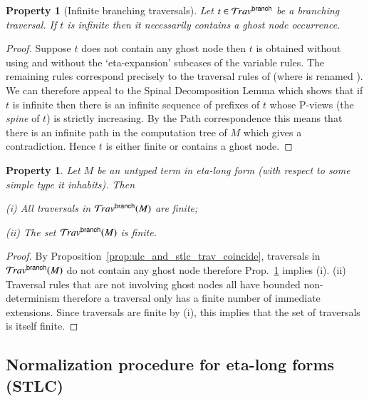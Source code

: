 \documentclass{elsarticle}
\theoremstyle{plain}
\newtheorem{property}[theorem]{Property}
\theoremstyle{definition}
\theoremstyle{remark}
\newcommand{\ghostlmd}{{\lambda\!\!\lambda}}
\newcommand{\branching}{{\sf branch}}
\newcommand{\travsetbr}{{\travset^\branching}}
\begin{document}
\begin{property}[Infinite branching traversals]
\label{prop:branching_spine_property}
Let $t\in \travsetbr$ be a branching traversal. If $t$ is infinite then it necessarily contains a ghost node occurrence.
\end{property}
\begin{proof}
Suppose $t$ does not contain any ghost node then
$t$ is obtained without using \rulenamet{Lam^\ghostlmd_\branching} and without the `eta-expansion' subcases of the variable rules. The remaining rules correspond precisely to the traversal rules of
\cite{Ong2006} (where  is renamed ).
We can therefore appeal to the Spinal Decomposition Lemma
\cite[Lemma 14]{Ong2006} which shows that if $t$ is infinite then there is an infinite sequence of prefixes of $t$ whose P-views (the \emph{spine} of $t$) is strictly increasing. By the Path correspondence this means that there is an infinite path in the computation tree of $M$ which gives a contradiction. Hence $t$ is either finite or contains a ghost node.
\end{proof}

\begin{property}
\label{prop:etalong_trav_finite}
Let $M$ be an untyped term in eta-long form (with respect to some simple type it inhabits). Then
\begin{enumerate*}
\item[(i)] All traversals in $\travsetbr(M)$ are finite;
\item[(ii)] The set $\travsetbr(M)$ is finite.
\end{enumerate*}
\end{property}
\begin{proof}
By Proposition~\ref{prop:ulc_and_stlc_trav_coincide}, traversals in $\travsetbr(M)$ do not contain any ghost node therefore Prop.~\ref{prop:branching_spine_property} implies (i).
(ii) Traversal rules that are not involving ghost nodes all have bounded non-determinism therefore a traversal only has a finite number of immediate extensions. Since traversals are finite by (i), this implies that the set of traversals is itself finite.
\end{proof}


\subsection{Normalization procedure for eta-long forms (STLC)}
\end{document}
